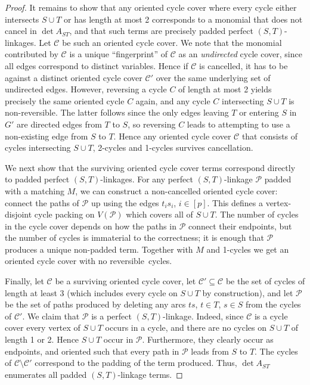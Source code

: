 \documentclass[10pt,a4paper]{article}
\newcommand{\cC}{\ensuremath{\mathcal C}\xspace}
\newcommand{\cP}{\ensuremath{\mathcal P}\xspace}
\begin{document}
\begin{proof}
  It remains to show that any oriented cycle cover where every cycle either
  intersects $S \cup T$ or has length at most 2 corresponds to a monomial
  that does not cancel in $\det A_{ST}$, and that such terms are precisely
  padded perfect $(S,T)$-linkages. Let $\cC$ be such an oriented cycle cover.
  We note that the monomial contributed by $\cC$ is a unique ``fingerprint'' of $\cC$
  as an \emph{undirected} cycle cover, since all edges correspond to
  distinct variables. Hence if $\cC$ is cancelled, it has to be
  against a distinct oriented cycle cover $\cC'$ over the same
  underlying set of undirected edges. However, reversing a cycle $C$ of
  length at most 2 yields precisely the same oriented cycle $C$ again,
  and any cycle $C$ intersecting $S \cup T$ is non-reversible.
  The latter follows since the only edges leaving $T$ or entering $S$ in $G'$ are
  directed edges from $T$ to $S$, so reversing $C$ leads to attempting to use a
  non-existing edge from $S$ to $T$.
  Hence any oriented cycle cover $\cC$ that consists of cycles intersecting $S \cup T$, 
  2-cycles and 1-cycles survives cancellation. 

  We next show that the surviving oriented cycle cover terms
  correspond directly to padded perfect $(S,T)$-linkages.
  For any perfect $(S,T)$-linkage $\cP$ padded with a matching $M$, 
  we can construct a non-cancelled oriented cycle cover:
  connect the paths of $\cP$ up using the edges $t_is_i$, $i \in [p]$.
  This defines a vertex-disjoint cycle packing on $V(\cP)$ which covers all of $S \cup T$.
  The number of cycles in the cycle cover depends on how the paths in
  $\cP$ connect their endpoints, but the number of cycles is immaterial
  to the correctness; it is enough that $\cP$ produces a unique
  non-padded term. Together with $M$ and 1-cycles we get an oriented
  cycle cover with no reversible~cycles. 

  Finally, let $\cC$ be a surviving oriented cycle cover,
  let $\cC' \subseteq \cC$ be the set of cycles of length at least 3
  (which includes every cycle on $S \cup T$ by construction),
  and let $\cP$ be the set of paths produced by deleting any arcs
  $ts$, $t \in T$, $s \in S$ from the cycles of $\cC'$.
  We claim that $\cP$ is a perfect $(S,T)$-linkage. 
  Indeed, since $\cC$ is a cycle cover every vertex of $S \cup T$
  occurs in a cycle, and there are no cycles on $S \cup T$ of length 1 or 2.
  Hence $S \cup T$ occur in $\cP$. Furthermore, they clearly occur as
  endpoints, and oriented such that every path in $\cP$ leads from $S$
  to $T$. The cycles of $\cC \setminus \cC'$ correspond to the padding 
  of the term produced. 
  Thus, $\det A_{ST}$ enumerates all padded $(S, T)$-linkage terms.
\end{proof}
\end{document}
